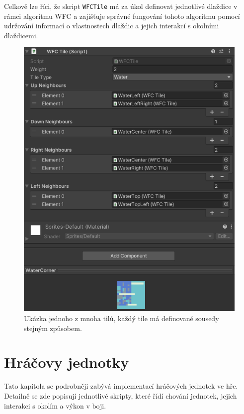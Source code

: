 Celkově lze říci, že skript \texttt{WFCTile} má za úkol definovat jednotlivé dlaždice v rámci algoritmu WFC a zajišťuje správné fungování tohoto algoritmu pomocí udržování informací o vlastnostech dlaždic a jejich interakcí s okolními dlaždicemi.

\begin{figure}[H]
	\centering
	\includegraphics[scale=1]{obrazky-figures/WFCTile.png}
	\caption{Ukázka jednoho z mnoha tilů, každý tile má definované sousedy stejným způsobem.}
	\label{fig:WFCTile}
\end{figure}

\section{Hráčovy jednotky}
Tato kapitola se podrobněji zabývá implementací hráčových jednotek ve hře. Detailně se zde popisují jednotlivé skripty, které řídí chování jednotek, jejich interakci s okolím a výkon v boji.

